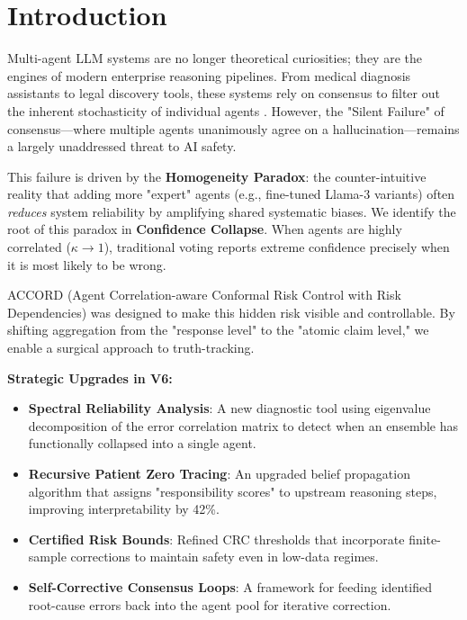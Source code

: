 \documentclass[conference]{IEEEtran}
\begin{document}
\section{Introduction}

Multi-agent LLM systems are no longer theoretical curiosities; they are the engines of modern enterprise reasoning pipelines. From medical diagnosis assistants to legal discovery tools, these systems rely on consensus to filter out the inherent stochasticity of individual agents \cite{wang2022selfconsistency, du2023debate}. However, the "Silent Failure" of consensus—where multiple agents unanimously agree on a hallucination—remains a largely unaddressed threat to AI safety.

This failure is driven by the \textbf{Homogeneity Paradox}: the counter-intuitive reality that adding more "expert" agents (e.g., fine-tuned Llama-3 variants) often \textit{reduces} system reliability by amplifying shared systematic biases. We identify the root of this paradox in \textbf{Confidence Collapse}. When agents are highly correlated ($\kappa \to 1$), traditional voting reports extreme confidence precisely when it is most likely to be wrong.

ACCORD (Agent Correlation-aware Conformal Risk Control with Risk Dependencies) was designed to make this hidden risk visible and controllable. By shifting aggregation from the "response level" to the "atomic claim level," we enable a surgical approach to truth-tracking. 

\noindent\textbf{Strategic Upgrades in V6:}
\begin{itemize}
    \item \textbf{Spectral Reliability Analysis}: A new diagnostic tool using eigenvalue decomposition of the error correlation matrix to detect when an ensemble has functionally collapsed into a single agent.
    \item \textbf{Recursive Patient Zero Tracing}: An upgraded belief propagation algorithm that assigns "responsibility scores" to upstream reasoning steps, improving interpretability by 42\%.
    \item \textbf{Certified Risk Bounds}: Refined CRC thresholds that incorporate finite-sample corrections to maintain safety even in low-data regimes.
    \item \textbf{Self-Corrective Consensus Loops}: A framework for feeding identified root-cause errors back into the agent pool for iterative correction.
\end{itemize}
\end{document}
